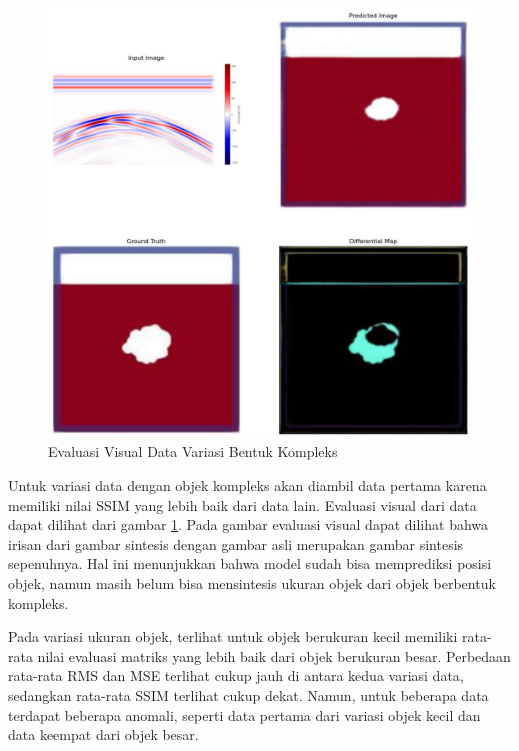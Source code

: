\begin{figure}[ht]
  \centering
  \includegraphics[scale=0.15]{gambar/diffMapKompleks.jpg}
  \caption{Evaluasi Visual Data Variasi Bentuk Kompleks}
  \label{fig:diffmapkompleks}
\end{figure}

Untuk variasi data dengan objek kompleks akan diambil data pertama karena memiliki nilai SSIM yang lebih baik dari data lain. 
Evaluasi visual dari data dapat dilihat dari gambar \ref{fig:diffmapkompleks}. 
Pada gambar evaluasi visual dapat dilihat bahwa irisan dari gambar sintesis dengan gambar asli merupakan gambar sintesis sepenuhnya. 
Hal ini menunjukkan bahwa model sudah bisa memprediksi posisi objek, namun masih belum bisa mensintesis ukuran objek dari objek berbentuk kompleks.

Pada variasi ukuran objek, terlihat untuk objek berukuran kecil memiliki rata-rata nilai evaluasi matriks yang lebih baik dari objek berukuran besar. 
Perbedaan rata-rata RMS dan MSE terlihat cukup jauh di antara kedua variasi data, sedangkan rata-rata SSIM terlihat cukup dekat. 
Namun, untuk beberapa data terdapat beberapa anomali, seperti data pertama dari variasi objek kecil dan data keempat dari objek besar. 

